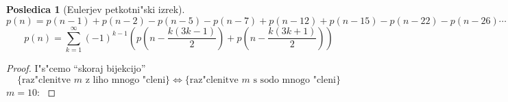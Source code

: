 \documentclass[a4paper,12pt]{article}
\theoremstyle{definition}
\newtheorem{conseq}[counter]{Posledica}
\theoremstyle{remark}
\newcommand{\Z}{\mathbb{Z}}
\begin{document}
\begin{conseq}[Eulerjev petkotni"ski izrek]
	\[p(n) = p(n - 1) + p(n - 2) - p(n - 5) - p(n - 7) + p(n - 12) + p(n - 15) - p(n - 22) - p(n - 26) \cdots\]
	\[p(n) = \sum_{k = 1}^{\infty} (-1)^{k - 1} (p(n - \frac{k (3k - 1)}{2}) + p(n - \frac{k (3k + 1)}{2}))\]
\end{conseq}
\begin{proof}
	I"s"cemo ``skoraj bijekcijo'' \label{TODO: kaj to pomeni?}
	\[\{\text{raz"clenitve $m$ z liho mnogo "cleni}\} \iff \{\text{raz"clenitve $m$ s sodo mnogo "cleni}\}\]
	$m = 10$:
	\label{TODO: kaj se da nardit glede teh diagramov?}


\end{proof}
\end{document}
